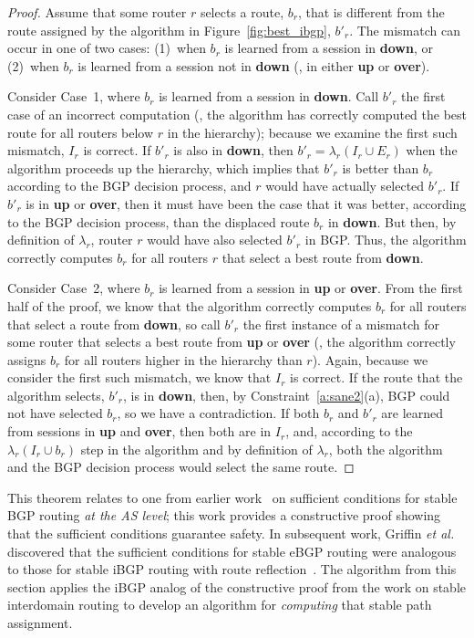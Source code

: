 \begin{proof}
Assume that some router $r$ selects a route,
$b_r$, that is different from the route assigned by the algorithm in
Figure~\ref{fig:best_ibgp}, $b'_r$.  
The mismatch can occur in one of two cases: (1)~when $b_r$ 
is learned from a session in {\bf down}, or (2)~when $b_r$ is learned from a
session not in {\bf down} (\ie, in either {\bf up} or {\bf over}).  

Consider Case~1, where $b_r$ is learned from a session in {\bf down}.
Call $b'_r$ the first case of an incorrect computation (\ie, the
algorithm has correctly computed the best route for all routers below
$r$ in the hierarchy); because we examine the first such mismatch, $I_r$
is correct.  If $b'_r$ is also in {\bf down}, then $b'_r = \lambda_r(I_r
\cup E_r)$ when the algorithm proceeds up the hierarchy, which implies
that $b'_r$ is better than $b_r$ according to the BGP decision process,
and $r$ would have actually selected $b'_r$.  If $b'_r$ is in {\bf up}
or {\bf over}, then it must have been the case that it was better,
according to the BGP decision process, than the displaced route $b_r$ in
{\bf down}.
But then, by definition of $\lambda_r$, router $r$ would have also selected
$b'_r$ in BGP.
Thus, the algorithm
correctly computes $b_r$ for all routers $r$ that select a best route
from {\bf down}.


Consider Case~2, where $b_r$ is learned from a session in {\bf up} or
{\bf over}.
%
From the first half of the proof, we know that the algorithm correctly
computes $b_r$ for all routers that 
select a route from {\bf down}, so call $b'_r$ the first instance of a
mismatch for some router that selects a best route from {\bf
up} or {\bf over} (\ie, the algorithm correctly assigns $b_r$ for all
routers higher in the hierarchy than $r$). Again, because we consider the first
such mismatch, we know that $I_r$ is correct. 
%
If 
the route that the algorithm selects, $b'_r$, is in {\bf down}, then, by
Constraint~\ref{a:sane2}(a), BGP could not have selected $b_r$, so we
have a contradiction.  
%
If both $b_r$ and $b'_r$ are learned from
sessions in {\bf up} and {\bf over}, then both are in $I_r$, and,
according to the $\lambda_r(I_r \cup b_r)$ step in the algorithm and by
definition of $\lambda_r$, both the algorithm and the BGP decision
process would select the same route.
\end{proof}

This theorem relates to one from earlier work~\cite{Gao2001a} on
sufficient conditions for stable BGP routing {\em at the AS level}; this
work provides a constructive proof showing that the sufficient
conditions guarantee safety.  In subsequent work, Griffin {\em et
al.} discovered that the sufficient conditions for stable eBGP routing
were analogous to those for stable iBGP routing with route
reflection~\cite{Griffin2002}.  The algorithm from this section applies
the iBGP analog of the constructive proof from the work on stable
interdomain routing to develop an algorithm for {\em computing} that
stable path assignment.

